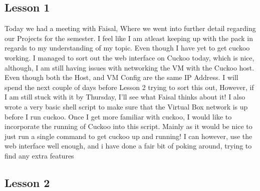 \documentclass{article}
\begin{document}
\subsection{Lesson 1}
Today we had a meeting with Faisal, Where we went into further detail regarding our Projects for the semester. I feel like I am atleast keeping up with the pack in regards to my understanding of my topic. Even though I have yet to get cuckoo working. I managed to sort out the web interface on Cuckoo today, which is nice, although, I am still having issues with networking the VM with the Cuckoo host. Even though both the Host, and VM Config are the same IP Address. I will spend the next couple of days before Lesson 2 trying to sort this out, However, if I am still stuck with it by Thursday, I'll see what Faisal thinks about it! I also wrote a very basic shell script to make sure that the Virtual Box network is up before I run cuckoo. Once I get more familiar with cuckoo, I would like to incorporate the running of Cuckoo into this script. Mainly as it would be nice to just run a single command to get cuckoo up and running! I can however, use the web interface well enough, and i have done a fair bit of poking around, trying to find any extra features
\subsection{Lesson 2}
\end{document}
